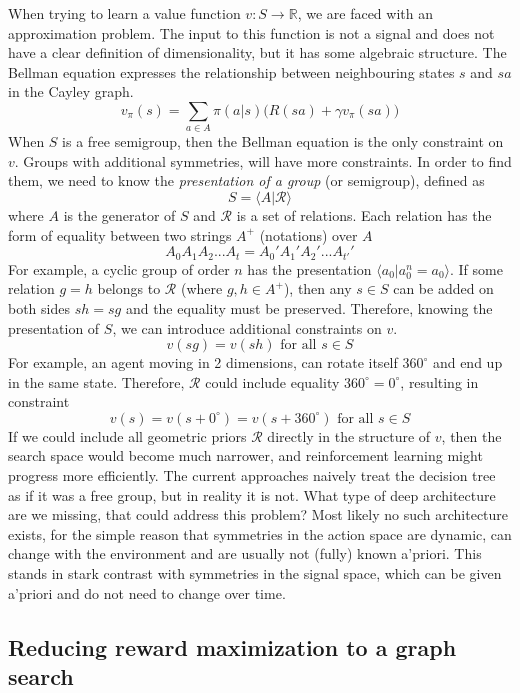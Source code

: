 \documentclass[12pt]{article}
\begin{document}
When trying to learn a value function $v:S\rightarrow \mathbb{R}$, we are faced with an approximation problem. The input to this function is not a signal and does not have a clear definition of dimensionality, but it has some algebraic structure.  The Bellman equation expresses the relationship between neighbouring states $s$ and $sa$ in the Cayley graph.
\[
v_\pi(s) = \sum_{a\in A} \pi(a|s)\big(R(sa)+\gamma v_\pi(sa)\big)
\]
When $S$ is a free semigroup, then the Bellman equation is the only constraint on $v$.
Groups with additional symmetries, will have more constraints. In order to find them, we need to know the \textit{presentation of a group} (or semigroup), defined as
\[
S = \langle A \vert \mathcal{R} \rangle
\]
where $A$ is the generator of $S$ and $\mathcal{R}$ is a set of relations. Each relation has the form of equality between two strings $A^+$ (notations) over $A$
\[
A_0A_1A_2...A_t = A_0'A_1'A_2'...A_{t'}'
\]
For example, a cyclic  group of order $n$ has the presentation $\langle a_0 \vert a_0^n=a_0 \rangle$. If some relation $g=h$ belongs to $\mathcal{R}$ (where $g,h\in A^+$), then any $s\in S$ can be added on both sides $sh=sg$ and the equality must be preserved.  Therefore, knowing the presentation of $S$, we can introduce additional constraints on $v$.  
\[
v(sg) = v(sh) \text{ for all }s\in S 
\]
For example, an agent moving in 2 dimensions, can rotate itself $360^\circ$ and end up in the same state. Therefore, $\mathcal{R}$ could include equality $360^\circ=0^\circ$, resulting in constraint
\[
v(s) = v(s+0^\circ) = v(s+360^\circ) \text{ for all }s\in S
\]
If we could include all geometric priors $\mathcal{R}$ directly in the structure of $v$, then the search space would become much narrower, and reinforcement learning might progress more efficiently. The current approaches naively treat the decision tree as if it was a free group, but in reality it is not. What type of deep architecture are we missing, that could address this problem? Most likely no such architecture exists, for the simple reason that symmetries in the action space are dynamic, can change with the environment and are usually not (fully) known a'priori. This stands in stark contrast with symmetries in the signal space, which can be given a'priori and do not need to change over time.

\subsection{Reducing reward maximization to a graph search}
\end{document}
